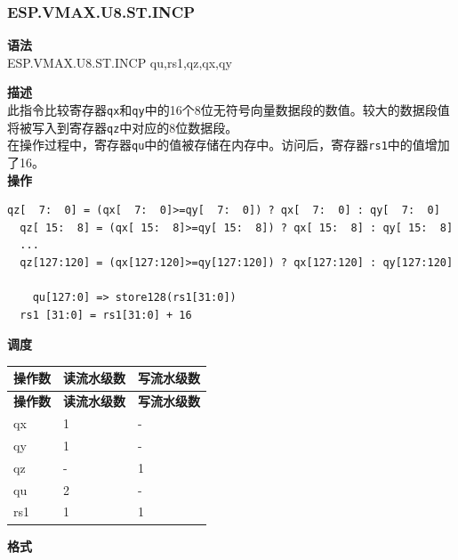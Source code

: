 \newpage

\newpage
\subsubsection{ESP.VMAX.U8.ST.INCP}\label{instruction:ESPVMAXU8STINCP}
\textbf{语法}\\
ESP.VMAX.U8.ST.INCP qu,rs1,qz,qx,qy

\textbf{描述}\\
此指令比较寄存器\lstinline{qx}和\lstinline{qy}中的16个8位无符号向量数据段的数值。较大的数据段值将被写入到寄存器\lstinline{qz}中对应的8位数据段。\\在操作过程中，寄存器\lstinline{qu}中的值被存储在内存中。访问后，寄存器\lstinline{rs1}中的值增加了16。\\
\textbf{操作}
\begin{lstlisting}[escapeinside=`?]
  qz[  7:  0] = (qx[  7:  0]>=qy[  7:  0]) ? qx[  7:  0] : qy[  7:  0]
  qz[ 15:  8] = (qx[ 15:  8]>=qy[ 15:  8]) ? qx[ 15:  8] : qy[ 15:  8]
  ...
  qz[127:120] = (qx[127:120]>=qy[127:120]) ? qx[127:120] : qy[127:120]

    qu[127:0] => store128(rs1[31:0])
  rs1 [31:0] = rs1[31:0] + 16
\end{lstlisting}


\textbf{调度}\\
\begin{longtable}[c]{|l|l|l|}
    \hline
    \rowcolor{lightgray}
    \textbf{操作数} & \textbf{读流水级数} & \textbf{写流水级数} \\\hline
    \endfirsthead
    \hline
    \rowcolor{lightgray}
     \textbf{操作数} & \textbf{读流水级数} & \textbf{写流水级数} \\\hline
    \endhead
    \hline
    \endfoot

    qx & 1 & - \\\hline
  qy & 1 & - \\\hline
     qz & - & 1 \\\hline
     qu & 2 & - \\\hline
     rs1 & 1 & 1

\end{longtable}

\textbf{格式}\\

